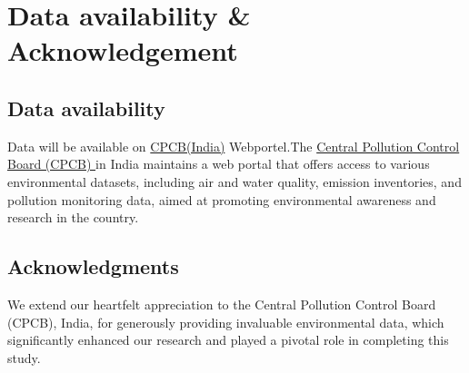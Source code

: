 
\chapter{Data availability \& Acknowledgement} %

\label{c7} %

\section*{Data availability}
Data will be available on \href{https: //app.cpcbccr.com/ccr/#/caaqm-dashboard-all/caaqm-landing}{CPCB(India)} Webportel.The \href{https: //www.cpcb.nic.in/}{Central Pollution Control Board (CPCB) } in India maintains a web portal that offers access to various environmental datasets,  including air and water quality,  emission inventories,  and pollution monitoring data,  aimed at promoting environmental awareness and research in the country.

\section*{Acknowledgments}
We extend our heartfelt appreciation to the Central Pollution Control Board (CPCB),  India,  for generously providing invaluable environmental data,  which significantly enhanced our research and played a pivotal role in completing this study.
